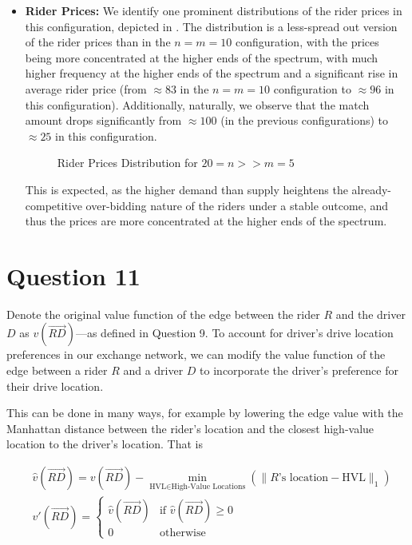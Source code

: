 \documentclass{article}
\begin{document}
\begin{enumerate}[label=(\alph*)]
\begin{itemize}
        \item \textbf{Rider Prices:} We identify one prominent distributions of the rider prices in this configuration, depicted in . The distribution is a less-spread out version of the rider prices than in the $n = m = 10$ configuration, with the prices being more concentrated at the higher ends of the spectrum, with much higher frequency at the higher ends of the spectrum and a significant rise in average rider price (from $\approx 83$ in the $n = m = 10$ configuration to $\approx 96$ in this configuration). Additionally, naturally, we observe that the match amount drops significantly from $\approx 100$ (in the previous configurations) to $\approx 25$ in this configuration.
        
        \begin{figure}[H]
            \centering
            \resizebox{0.5\textwidth}{!}{}
            \caption{Rider Prices Distribution for $20 = n >> m = 5$}
            \label{fig:q10b_n=20_m=5_rp}
        \end{figure}

        This is expected, as the higher demand than supply heightens the already-competitive over-bidding nature of the riders under a stable outcome, and thus the prices are more concentrated at the higher ends of the spectrum.

    \end{itemize}
    
\end{enumerate}


\section{Question 11}
Denote the original value function of the edge between the rider $R$ and the driver $D$ as $v(\overrightarrow{RD})$---as defined in Question 9. To account for driver's drive location preferences in our exchange network, we can modify the value function of the edge between a rider $R$ and a driver $D$ to incorporate the driver's preference for their drive location.

This can be done in many ways, for example by lowering the edge value with the Manhattan distance between the rider's location and the closest high-value location to the driver's location. That is

\begin{align*}
    & \hat{v}(\overrightarrow{RD}) = v(\overrightarrow{RD}) - \min_{\text{HVL} \in \text{High-Value Locations}}{\left( \|R\text{'s location} - \text{HVL}\|_1 \right)} \\
    & v'(\overrightarrow{RD}) = \begin{cases}
        \hat{v}(\overrightarrow{RD}) & \text{if } \hat{v}(\overrightarrow{RD}) \geq 0 \\
        0 & \text{otherwise}
    \end{cases}
\end{align*}
\end{document}
